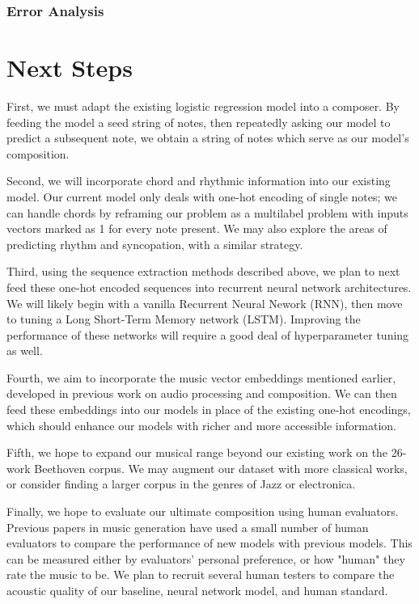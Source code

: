 \documentclass[twoside,twocolumn]{article}
\begin{document}
\subsubsection{Error Analysis}



\section{Next Steps}

First, we must adapt the existing logistic regression model into a composer. By feeding the model a seed string of notes, then repeatedly asking our model to predict a subsequent note, we obtain a string of notes which serve as our model's composition.

Second, we will incorporate chord and rhythmic information into our existing model. Our current model only deals with one-hot encoding of single notes; we can handle chords by reframing our problem as a multilabel problem with inputs vectors marked as 1 for every note present. We may also explore the areas of predicting rhythm and syncopation, with a similar strategy.

Third, using the sequence extraction methods described above, we plan to next feed these one-hot encoded sequences into recurrent neural network architectures. We will likely begin with a vanilla Recurrent Neural Nework (RNN), then move to tuning a Long Short-Term Memory network (LSTM). Improving the performance of these networks will require a good deal of hyperparameter tuning as well.

Fourth, we aim to incorporate the music vector embeddings mentioned earlier, developed in previous work on audio processing and composition. We can then feed these embeddings into our models in place of the existing one-hot encodings, which should enhance our models with richer and more accessible information.

Fifth, we hope to expand our musical range beyond our existing work on the 26-work Beethoven corpus. We may augment our dataset with more classical works, or consider finding a larger corpus in the genres of Jazz or electronica.

Finally, we hope to evaluate our ultimate composition using human evaluators. Previous papers in music generation have used a small number of human evaluators to compare the performance of new models with previous models. This can be measured either by evaluators' personal preference, or how "human" they rate the music to be. We plan to recruit several human testers to compare the acoustic quality of our baseline, neural network model, and human standard.
\end{document}
